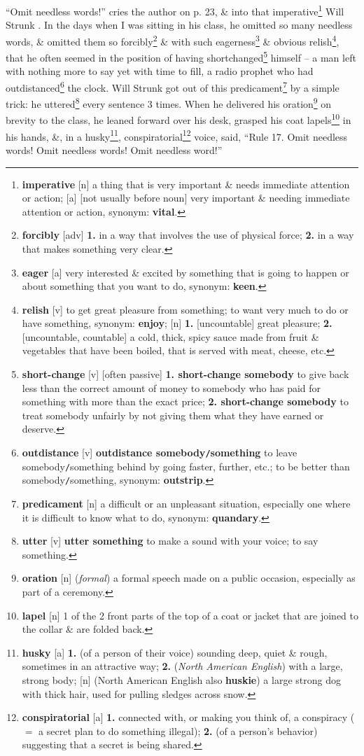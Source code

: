 \documentclass{article}
\begin{document}
``Omit needless words!'' cries the author on p. 23, \& into that imperative\footnote{{\bf imperative} [n] a thing that is very important \& needs immediate attention or action; [a] [not usually before noun] very important \& needing immediate attention or action, {\sc synonym}: {\bf vital}.} Will Strunk . In the days when I was sitting in his class, he omitted so many needless words, \& omitted them so forcibly\footnote{{\bf forcibly} [adv] {\bf 1.} in a way that involves the use of physical force; {\bf 2.} in a way that makes something very clear.} \& with such eagerness\footnote{{\bf eager} [a] very interested \& excited by something that is going to happen or about something that you want to do, {\sc synonym}: {\bf keen}.} \& obvious relish\footnote{{\bf relish} [v] to get great pleasure from something; to want very much to do or have something, {\sc synonym}: {\bf enjoy}; [n] {\bf 1.} [uncountable] great pleasure; {\bf 2.} [uncountable, countable] a cold, thick, spicy sauce made from fruit \& vegetables that have been boiled, that is served with meat, cheese, etc.}, that he often seemed in the position of having shortchanged\footnote{{\bf short-change} [v] [often passive] {\bf 1. short-change somebody} to give back less than the correct amount of money to somebody who has paid for something with more than the exact price; {\bf 2. short-change somebody} to treat somebody unfairly by not giving them what they have earned or deserve.} himself -- a man left with nothing more to say yet with time to fill, a radio prophet who had outdistanced\footnote{{\bf outdistance} [v] {\bf outdistance somebody{\tt/}something} to leave somebody{\tt/}something behind by going faster, further, etc.; to be better than somebody{\tt/}something, {\sc synonym}: {\bf outstrip}.} the clock. Will Strunk got out of this predicament\footnote{{\bf predicament} [n] a difficult or an unpleasant situation, especially one where it is difficult to know what to do, {\sc synonym}: {\bf quandary}.} by a simple trick: he uttered\footnote{{\bf utter} [v] {\bf utter something} to make a sound with your voice; to say something.} every sentence 3 times. When he delivered his oration\footnote{{\bf oration} [n] ({\it formal}) a formal speech made on a public occasion, especially as part of a ceremony.} on brevity to the class, he leaned forward over his desk, grasped his coat lapels\footnote{{\bf lapel} [n] 1 of the 2 front parts of the top of a coat or jacket that are joined to the collar \& are folded back.} in his hands, \&, in a husky\footnote{{\bf husky} [a] {\bf 1.} (of a person of their voice) sounding deep, quiet \& rough, sometimes in an attractive way; {\bf 2.} ({\it North American English}) with a large, strong body; [n] (North American English also {\bf huskie}) a large strong dog with thick hair, used for pulling sledges across snow.}, conspiratorial\footnote{{\bf conspiratorial} [a] {\bf 1.} connected with, or making you think of, a conspiracy ($=$ a secret plan to do something illegal); {\bf 2.} (of a person's behavior) suggesting that a secret is being shared.} voice, said, ``Rule 17. Omit needless words! Omit needless words! Omit needless word!''
\end{document}
